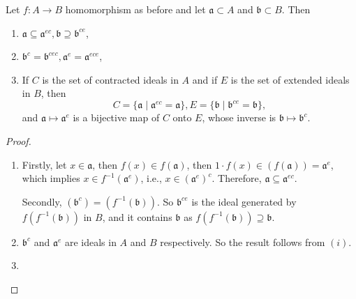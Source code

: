 \begin{proposition}\label{prop:contractextendprop}
    Let \(f: A \longrightarrow B\) homomorphism as before and let \(\mathfrak{a} \subset A\) and  \(\mathfrak{b} \subset B\). Then 
    \begin{enumerate}[label=\roman*.]
         \item \(\mathfrak{a} \subseteq \mathfrak{a}^{ec}, \mathfrak{b} \supseteq \mathfrak{b}^{ce}\),
         \item \(\mathfrak{b}^c = \mathfrak{b}^{cec}, \mathfrak{a}^e = \mathfrak{a}^{ece}\),
     \item If \(C\) is the set of contracted ideals in  \(A\) and if  \(E\) is the set of extended ideals in  \(B\), then  \[C = \{\mathfrak{a}  \mid \mathfrak{a}^{ec} = \mathfrak{a}\}, E = \{\mathfrak{b}  \mid \mathfrak{b}^{ce} = \mathfrak{b}\},\] and \(\mathfrak{a} \mapsto \mathfrak{a}^e\) is a bijective map of \(C\) onto  \(E\), whose inverse is  \(\mathfrak{b} \mapsto \mathfrak{b}^c\).
     \end{enumerate}   
\end{proposition}
\begin{proof}
    \begin{enumerate}[label=\roman*.]
        \item Firstly, let \(x \in \mathfrak{a}\), then \(f(x) \in f(\mathfrak{a})\), then \(1 \cdot f(x) \in (f(\mathfrak{a})) = \mathfrak{a}^e\), which implies \(x \in f^{-1}(\mathfrak{a}^e)\), i.e., \(x \in (\mathfrak{a}^e)^c\). Therefore, \(\mathfrak{a} \subseteq \mathfrak{a}^{ec}\).

            Secondly, \((\mathfrak{b}^c) = (f^{-1}(\mathfrak{b}))\). So \(\mathfrak{b}^{ce}\) is the ideal generated by \(f(f^{-1}(\mathfrak{b}))\) in \(B\), and it contains  \(\mathfrak{b}\) as \(f(f^{-1}(\mathfrak{b})) \supseteq \mathfrak{b}\).
        \item \(\mathfrak{b}^c\) and \(\mathfrak{a}^e\) are ideals in \(A\) and  \(B\) respectively. So the result follows from  \((i)\).
        \item {}
    \end{enumerate}
\end{proof}
